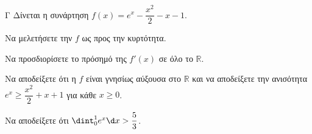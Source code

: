 \begin{thema}{Γ}
Δίνεται η συνάρτηση $f(x) = e^x - \dfrac{x^2}{2} - x - 1$.
\begin{erwthma}
  \item Να μελετήσετε την $f$ ως προς την κυρτότητα.
  \item Να προσδιορίσετε το πρόσημό της $f'(x)$ σε όλο το $\mathbb{R}$.
  \item Να αποδείξετε ότι η $f$ είναι γνησίως αύξουσα στο $\mathbb{R}$ και να αποδείξετε την ανισότητα $e^x \ge \dfrac{x^2}{2} + x + 1$ για κάθε $x \ge 0$.
  \item Να αποδείξετε ότι $\dint_0^1 e^x \d x > \dfrac{5}{3}$.
\end{erwthma}
\end{thema}
